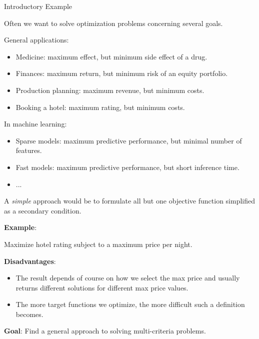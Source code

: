 \begin{frame}[allowframebreaks]{Introductory Example}

Often we want to solve optimization problems concerning several goals.

General applications:
\begin{itemize}
\item Medicine: maximum effect, but minimum side effect of a drug.
\item Finances: maximum return, but minimum risk of an equity portfolio.
\item Production planning: maximum revenue, but minimum costs.
\item Booking a hotel: maximum rating, but minimum costs.
\end{itemize}

In machine learning:
\begin{itemize}
\item Sparse models: maximum predictive performance, but minimal number of features.
\item Fast models: maximum predictive performance, but short inference time.
\item ...
\end{itemize}

A \textit{simple} approach would be to formulate all but one objective function simplified as a secondary condition. %

\vspace*{0.2cm}

\framebreak

\textbf{Example}:

Maximize hotel rating subject to a maximum price per night.

\vspace*{0.2cm}

 \textbf{Disadvantages}:
\begin{itemize}
 \item The result depends of course on how we select the max price and usually returns different solutions for different max price values.
 \item The more target functions we optimize, the more difficult such a definition becomes.
\end{itemize}

\vspace*{0.2cm}

\textbf{Goal}: Find a general approach to solving multi-criteria problems.



\end{frame}
